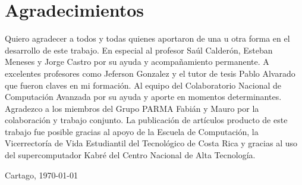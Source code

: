\chapter*{Agradecimientos}
\thispagestyle{empty}

Quiero agradecer a todos y todas quienes aportaron de una u otra forma en el desarrollo de este trabajo. En especial al profesor Saúl Calderón, Esteban Meneses y Jorge Castro por su ayuda y acompañamiento permanente. A  excelentes profesores como Jeferson Gonzalez y el tutor de tesis Pablo Alvarado que fueron claves en mi formación. Al equipo del Colaboratorio Nacional de Computación Avanzada por su ayuda y aporte en momentos determinantes. Agradezco a los miembros del Grupo PARMA Fabián y Mauro por la colaboración y trabajo conjunto. La publicación de artículos producto de este trabajo fue posible gracias al apoyo de la Escuela de Computación, la Vicerrectoría de Vida Estudiantil del Tecnológico de Costa Rica y gracias al uso del supercomputador Kabré del Centro Nacional de Alta Tecnología.

\vspace*{1cm}

\scriptAuthor

Cartago, \today

\cleardoublepage

